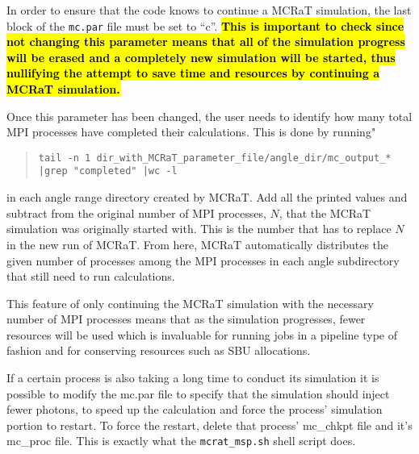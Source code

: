 \documentclass[12pt,a4paper]{article}
\begin{document}
 In order to ensure that the code knows to continue a MCRaT simulation, the last block of the \texttt{mc.par} file must be set to ``c''. \hl{\bf This is important to check since not changing this parameter means that all of the simulation progress will be erased and a completely new simulation will be started, thus nullifying the attempt to save time and resources by continuing a MCRaT simulation.} 
 
Once this parameter has been changed, the user needs to identify how many total MPI processes have completed their calculations. This is done by running"
 \begin{quotation}
\texttt{tail -n 1 dir\_with\_MCRaT\_parameter\_file/angle\_dir/mc\_output\_* |grep "completed" |wc -l}
 \end{quotation}
in each angle range directory created by MCRaT. Add all the printed values and subtract from the original number of MPI processes, $N$, that the MCRaT simulation was originally started with. This is the number that has to replace $N$ in the new run of MCRaT. From here, MCRaT automatically distributes the given number of processes among the MPI processes in each angle subdirectory that still need to run calculations.
 
 This feature of only continuing the MCRaT simulation with the necessary number of MPI processes means that as the simulation progresses, fewer resources will be used which is invaluable for running jobs in a pipeline type of fashion and for conserving resources such as SBU allocations.
 
 If a certain process is also taking a long time to conduct its simulation it is possible to modify the mc.par file to specify that the simulation should inject fewer photons, to speed up the calculation and force the process' simulation portion to restart. To force the restart, delete that process' mc\_chkpt file and it's  mc\_proc file. This is exactly what the \texttt{mcrat\_msp.sh} shell script does. 
 
\end{document}
